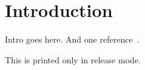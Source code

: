 \section{Introduction}

	Intro goes here.
	And one reference~\cite{practical-ore}.

	\begin{release}
		This is printed only in release mode.
	\end{release}
